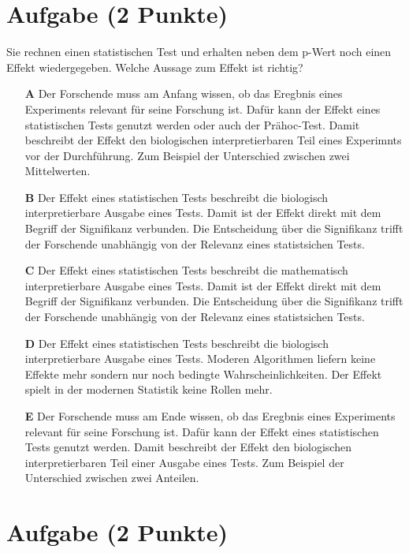 \documentclass[a4paper, 9pt]{scrartcl}\usepackage[]{graphicx}\usepackage[]{xcolor}
\begin{document}
\section{Aufgabe \hfill (2 Punkte)}



Sie rechnen einen statistischen Test und erhalten neben dem p-Wert noch einen Effekt wiedergegeben. Welche Aussage zum Effekt ist richtig?



\begin{enumerate}
\item [\textbf{A} \msquare] Der Forschende muss am Anfang wissen, ob das Eregbnis eines Experiments relevant für seine Forschung ist. Dafür kann der Effekt eines statistischen Tests genutzt werden oder auch der Prähoc-Test. Damit beschreibt der Effekt den biologischen interpretierbaren Teil eines Experimnts vor der Durchführung. Zum Beispiel der Unterschied zwischen zwei Mittelwerten.
\item [\textbf{B} \msquare] Der Effekt eines statistischen Tests beschreibt die biologisch interpretierbare Ausgabe eines Tests. Damit ist der Effekt direkt mit dem Begriff der Signifikanz verbunden. Die Entscheidung über die Signifikanz trifft der Forschende unabhängig von der Relevanz eines statistsichen Tests.
\item [\textbf{C} \msquare] Der Effekt eines statistischen Tests beschreibt die mathematisch interpretierbare Ausgabe eines Tests. Damit ist der Effekt direkt mit dem Begriff der Signifikanz verbunden. Die Entscheidung über die Signifikanz trifft der Forschende unabhängig von der Relevanz eines statistsichen Tests.
\item [\textbf{D} \msquare] Der Effekt eines statistischen Tests beschreibt die biologisch interpretierbare Ausgabe eines Tests. Moderen Algorithmen liefern keine Effekte mehr sondern nur noch bedingte Wahrscheinlichkeiten. Der Effekt spielt in der modernen Statistik keine Rollen mehr.
\item [\textbf{E} \msquare] Der Forschende muss am Ende wissen, ob das Eregbnis eines Experiments relevant für seine Forschung ist. Dafür kann der Effekt eines statistischen Tests genutzt werden. Damit beschreibt der Effekt den biologischen interpretierbaren Teil einer Ausgabe eines Tests. Zum Beispiel der Unterschied zwischen zwei Anteilen.
\end{enumerate}

\section{Aufgabe \hfill (2 Punkte)}
\end{document}
